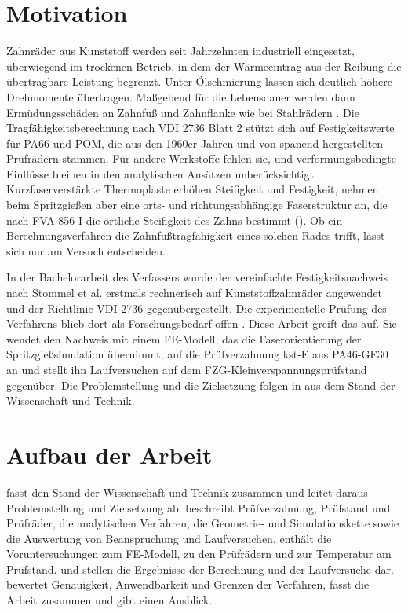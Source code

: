 \section{Motivation}
\label{sec:motivation}

Zahnräder aus Kunststoff werden seit Jahrzehnten industriell eingesetzt, überwiegend im trockenen Betrieb, in dem der Wärmeeintrag aus der Reibung die übertragbare Leistung begrenzt. Unter Ölschmierung lassen sich deutlich höhere Drehmomente übertragen. Maßgebend für die Lebensdauer werden dann Ermüdungsschäden an Zahnfuß und Zahnflanke wie bei Stahlrädern \cite[S.~1]{Has18}. Die Tragfähigkeitsberechnung nach VDI 2736 Blatt 2 stützt sich auf Festigkeitswerte für PA66 und POM, die aus den 1960er Jahren und von spanend hergestellten Prüfrädern stammen. Für andere Werkstoffe fehlen sie, und verformungsbedingte Einflüsse bleiben in den analytischen Ansätzen unberücksichtigt \cite[S.~1 bis 2]{Has18}. Kurzfaserverstärkte Thermoplaste erhöhen Steifigkeit und Festigkeit, nehmen beim Spritzgießen aber eine orts- und richtungsabhängige Faserstruktur an, die nach FVA 856 I die örtliche Steifigkeit des Zahns bestimmt (). Ob ein Berechnungsverfahren die Zahnfußtragfähigkeit eines solchen Rades trifft, lässt sich nur am Versuch entscheiden.

In der Bachelorarbeit des Verfassers wurde der vereinfachte Festigkeitsnachweis nach Stommel et al. erstmals rechnerisch auf Kunststoffzahnräder angewendet und der Richtlinie VDI 2736 gegenübergestellt. Die experimentelle Prüfung des Verfahrens blieb dort als Forschungsbedarf offen \cite[S.~71]{Kuh24}. Diese Arbeit greift das auf. Sie wendet den Nachweis mit einem FE-Modell, das die Faserorientierung der Spritzgießsimulation übernimmt, auf die Prüfverzahnung kst-E aus PA46-GF30 an und stellt ihn Laufversuchen auf dem FZG-Kleinverspannungsprüfstand gegenüber. Die Problemstellung und die Zielsetzung folgen in  aus dem Stand der Wissenschaft und Technik.

\section{Aufbau der Arbeit}
\label{sec:aufbau}

 fasst den Stand der Wissenschaft und Technik zusammen und leitet daraus Problemstellung und Zielsetzung ab.  beschreibt Prüfverzahnung, Prüfstand und Prüfräder, die analytischen Verfahren, die Geometrie- und Simulationskette sowie die Auswertung von Beanspruchung und Laufversuchen.  enthält die Voruntersuchungen zum FE-Modell, zu den Prüfrädern und zur Temperatur am Prüfstand.  und  stellen die Ergebnisse der Berechnung und der Laufversuche dar.  bewertet Genauigkeit, Anwendbarkeit und Grenzen der Verfahren,  fasst die Arbeit zusammen und gibt einen Ausblick.

